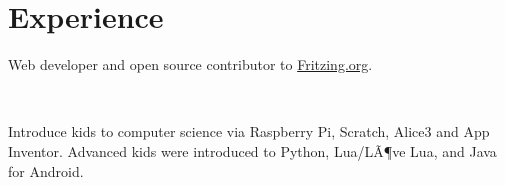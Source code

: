 \documentclass[]{deedy-resume-openfont} %
\newif\ifedu %
\begin{document}
\hfill
\begin{minipage}[t]{0.65\textwidth}

\section{Experience}
\vspace{\topsep}
\begin{tightemize}
\item Web developer and open source contributor to \href{http://fritzing.org}{Fritzing.org}.
\end{tightemize}
\sectionsep

\ifedu
\runsubsection{Expert Tutoring}{http://expert-tutoring.org}
\descript{| Private Tutor}
\location{September 2014 - Present | San Francisco, CA}
\begin{tightemize}
\item Chemistry and Mathematics tutor.
\end{tightemize}
\sectionsep
\fi

\\
\ifedu
\descript{EdTech | Makers Studio Curriculum Consultant}
\location{October 2014 | San Francisco, CA}
\begin{tightemize}
\item Updated the curriculum for the Makers Studio course.
\item Introduce kids to soldering and circuits. Make musical instruments, walking bug robots, and LED t-shirts with conductive thread.
\end{tightemize}
\fi
{}
\begin{tightemize}
\item Introduce kids to computer science via Raspberry Pi, Scratch, Alice3 and App Inventor.
Advanced kids were introduced to Python, Lua/LÃ¶ve Lua, and Java for Android.
\end{tightemize}
\ifedu
\descript{EdMo in the Park | Nature and Science Instructor}
\location{August 2014 | San Francisco, CA}
\begin{tightemize}
\item Incorporate art, science, history, and geography into a positive nature experience for kids.
\end{tightemize}
\sectionsep
\fi


\end{minipage}
\end{document}
